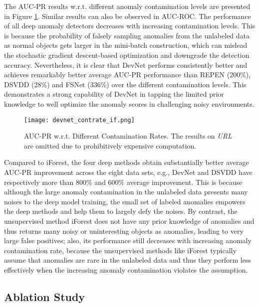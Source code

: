 \documentclass[sigconf]{acmart}
\begin{document}
The AUC-PR results w.r.t. different anomaly contamination levels are presented in Figure \ref{fig:contrate}. Similar results can also be observed in AUC-ROC. The performance of all deep anomaly detectors decreases with increasing contamination levels. This is because the probability of falsely sampling anomalies from the unlabeled data as normal objects gets larger in the mini-batch construction, which can mislead the stochastic gradient descent-based optimization and downgrade the detection accuracy. Nevertheless, it is clear that DevNet performs consistently better and achieves remarkably better average AUC-PR performance than REPEN (200\%), DSVDD (28\%) and FSNet (336\%) over the different contamination levels. This demonstrates a strong capability of DevNet in tapping the limited prior knowledge to well optimize the anomaly scores in challenging noisy environments.

\begin{figure}[h!]
  \centering
    \texttt{[image: devnet\_contrate\_if.png]}
  \caption{AUC-PR w.r.t. Different Contamination Rates. The results on \textit{URL} are omitted due to prohibitively expensive computation.}
  \label{fig:contrate}
\end{figure}

Compared to iForest, the four deep methods obtain substantially better average AUC-PR improvement across the eight data sets, e.g., DevNet and DSVDD have respectively more than 800\% and 600\% average improvement. This is because although the large anomaly contamination in the unlabeled data presents many noises to the deep model training, the small set of labeled anomalies empowers the deep methods and help them to largely defy the noises. By contrast, the unsupervised method iForest does not have any prior knowledge of anomalies and thus returns many noisy or uninteresting objects as anomalies, leading to very large false positives; also, its performance still decreases with increasing anomaly contamination rate, because the unsupervised methods like iForest typically assume that anomalies are rare in the unlabeled data and thus they perform less effectively when the increasing anomaly contamination violates the assumption.



\subsection{Ablation Study}\label{exp:ablation}
\end{document}
